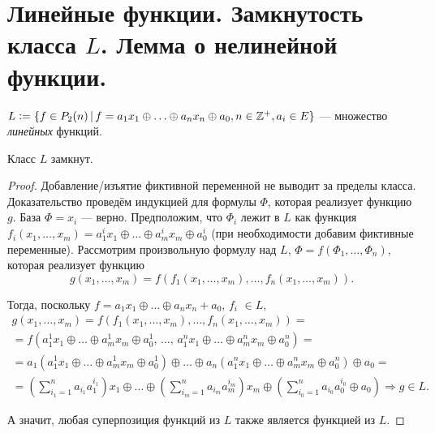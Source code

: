 \section{Линейные функции. Замкнутость класса $L$. Лемма о нелинейной функции.}

\begin{definition}
    $L \vcentcolon = \{f\in P_2(n)\, |\, f = a_1x_1 \oplus \ldots \oplus a_n x_n \oplus a_0, n \in \mathbb{Z}^+, a_i \in E\}$ --- множество \textit{линейных} функций.
\end{definition}

\begin{theorem}
    Класс $L$ замкнут.
\end{theorem}

\begin{proof}
    Добавление/изъятие фиктивной переменной не выводит за пределы класса.\\ 
    Доказательство проведём индукцией для формулы $\Phi$, которая реализует функцию $g$. База $\Phi = x_i$ --- верно. Предположим, что $\Phi_i$ лежит в $L$ как функция $f_i(x_1,\ldots,x_m) = a^i_1x_1 \oplus \ldots \oplus a^i_mx_m \oplus a^i_0$ (при необходимости добавим фиктивные переменные). Рассмотрим произвольную формулу над $L$, $\Phi = f(\Phi_1, \ldots, \Phi_n)$, которая реализует функцию
    \[
        g(x_1,\ldots, x_m) = f(f_1(x_1, \ldots, x_m), \ldots, f_n(x_1, \ldots, x_m)).
    \]
    
    Тогда, поскольку $f = a_1x_1 \oplus \ldots \oplus a_nx_n + a_0$, $f_i$ $\in L$,
    \begin{multline*}
        g(x_1,\ldots, x_m) = f(f_1(x_1, \ldots, x_m), \ldots, f_n(x_1, \ldots, x_m)) = \\ = f(a^1_1x_1 \oplus \ldots \oplus a^1_mx_m \oplus a^1_0,\, \ldots,\, a^n_1x_1 \oplus \ldots \oplus a^n_mx_m \oplus a^n_0) = \\ = a_1(a^1_1x_1 \oplus \ldots \oplus a^1_mx_m \oplus a^1_0) \oplus \ldots \oplus a_n(a^n_1x_1 \oplus \ldots \oplus a^n_mx_m \oplus a^n_0) \oplus a_0 = \\ = \left(\sum_{i_1 = 1}^n a_{i_1} a_1^{i_1}\right) x_1 \oplus \ldots \oplus \left(\sum_{i_m = 1}^n a_{i_m} a_m^{i_m}\right) x_m \oplus \left(\sum_{i_0 = 1}^n a_{i_0} a_0^{i_0} \oplus a_0\right) \Rightarrow g \in L.
    \end{multline*}
    
    А значит, любая суперпозиция функций из $L$ также является функцией из $L$.
\end{proof}

